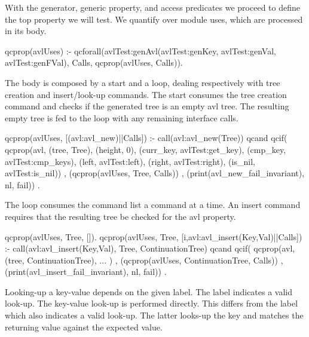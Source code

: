 With the generator, generic property, and access predicates we proceed to
define the top property we will test.
%
We quantify over module uses, which are processed in its body.
%
\begin{yapcode}
 qcprop(avlUses) :-
   qcforall(avlTest:genAvl(avlTest:genKey,
              avlTest:genVal, avlTest:genFVal),
            Calls, qcprop({avlUses, Calls})).
\end{yapcode}
%
The body is composed by a start and a loop, dealing respectively with
 tree creation and insert/look-up commands.
%
The start consumes the tree creation command and checks if the generated
tree is an empty avl tree.
%
The resulting empty tree is fed to the loop with any remaining interface
calls.
%
\begin{yapcode}
 qcprop({avlUses, [(avl:avl_new)||Calls]}) :-
   call(avl:avl_new(Tree))
  qcand
   qcif(
     qcprop({avl, (tree, Tree), (height, 0),
                  (curr_key, avlTest:get_key),
                  (cmp_key, avlTest:cmp_keys),
                  (left, avlTest:left),
                  (right, avlTest:right),
                  (is_nil, avlTest:is_nil)})
   , (qcprop({avlUses, Tree, Calls}))
   , (print(avl_new_fail_invariant), nl, fail))
   .
\end{yapcode}
%
The loop consumes the command list a command at a time.
%
An insert command requires that the resulting tree be checked for the
avl property.
%
\begin{yapcode}
 qcprop({avlUses, Tree, []}).
 qcprop({avlUses, Tree,
      [{i,avl:avl_insert(Key,Val)}||Calls]}) :-
   call(avl:avl_insert(Key,Val),
        Tree, ContinuationTree)
     qcand
   qcif(
     qcprop({avl, (tree, ContinuationTree),
             ... })
   , (qcprop({avlUses, ContinuationTree, Calls}))
   , (print(avl_insert_fail_invariant),
      nl, fail))
   .
\end{yapcode}
%
Looking-up a key-value depends on the given label.
%
The label  indicates a valid look-up.
%
The key-value look-up is performed directly.
%
This differs from the label  which also indicates a valid
look-up.
%
The latter looks-up the key and matches the returning value against the
expected value.
